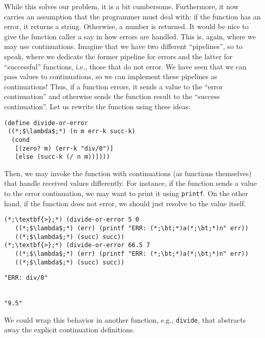While this solves our problem, it is a bit cumbersome. Furthermore, it now carries an assumption that the programmer must deal with: if the function has an error, it returns a string. Otherwise, a number is returned. It would be nice to give the function caller a say in how errors are handled. This is, again, where we may use continuations. Imagine that we have two different ``pipelines'', so to speak, where we dedicate the former pipeline for errors and the latter for ``successful'' functions, i.e., those that do not error. We have seen that we can pass values to continuations, so we can implement these pipelines as continuations! Thus, if a function errors, it sends a value to the ``error continuation'' and otherwise sends the function result to the ``success continuation''. Let us rewrite the function using these ideas:

\begin{cl}[]{}\begin{lstlisting}[language=MyScheme]
(define divide-or-error
 ((*;$\lambda$;*) (n m err-k succ-k)
  (cond
   [(zero? m) (err-k "div/0")]
   [else (succ-k (/ n m))])))
\end{lstlisting}\end{cl}

Then, we may invoke the function with continuations (as functions themselves) that handle received values differently. For instance, if the function sends a value to the error continuation, we may want to print it using \texttt{printf}. On the other hand, if the function does not error, we should just resolve to the value itself.

\begin{cloast}[]{}\begin{lstlisting}[language=MyScheme]
(*;\textbf{>};*) (divide-or-error 5 0
   ((*;$\lambda$;*) (err) (printf "ERR: (*;\bt;*)a(*;\bt;*)n" err))
   ((*;$\lambda$;*) (succ) succ))
(*;\textbf{>};*) (divide-or-error 66.5 7
   ((*;$\lambda$;*) (err) (printf "ERR: (*;\bt;*)a(*;\bt;*)n" err))
   ((*;$\lambda$;*) (succ) succ))
\end{lstlisting}
\tcblower
\begin{lstlisting}[language=MyOutput]
"ERR: div/0"


"9.5"
\end{lstlisting}
\end{cloast}

We could wrap this behavior in another function, e.g., \texttt{divide}, that abstracts away the explicit continuation definitions.

